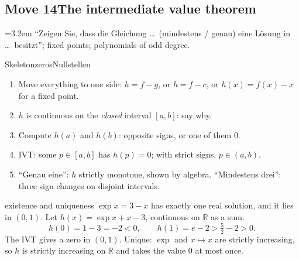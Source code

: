 \documentclass{kaelearn}
\newcommand\when[1]{\par\smallskip\noindent\hangindent=3.2em\hangafter=1%
  \makebox[3.2em][l]{\color{kldim}\pix{When}}#1\par\smallskip}
\newcommand\R{\mathbb R}
\begin{document}
\subsection{Move 14\quad The intermediate value theorem}
\when{``Zeigen Sie, dass die Gleichung \dots\ (mindestens / genau) eine Lösung in \dots\ besitzt''; fixed points; polynomials of
odd degree.}

\begin{panel}[unbreakable]{Skeleton}{zeros}{Nullstellen}
\begin{enumerate}
  \item Move everything to one side: $h=f-g$, or $h=f-c$, or $h(x)=f(x)-x$ for a fixed point.
  \item $h$ is continuous on the \emph{closed} interval $[a,b]$: say why.
  \item Compute $h(a)$ and $h(b)$: opposite signs, or one of them $0$.
  \item IVT: some $p\in[a,b]$ has $h(p)=0$; with strict signs, $p\in(a,b)$.
  \item ``Genau eine'': $h$ strictly monotone, shown by algebra. ``Mindestens drei'': three sign changes on disjoint intervals.
\end{enumerate}
\end{panel}

\begin{example}{existence and uniqueness}
$\exp x=3-x$ has exactly one real solution, and it lies in $(0,1)$. Let $h(x)=\exp x+x-3$, continuous on $\R$ as a sum.
\[ h(0)=1-3=-2<0,\qquad h(1)=e-2>\tfrac52-2>0 . \]
The IVT gives a zero in $(0,1)$. Unique: $\exp$ and $x\mapsto x$ are strictly increasing, so $h$ is strictly increasing on $\R$
and takes the value $0$ at most once.
\end{example}
\end{document}
